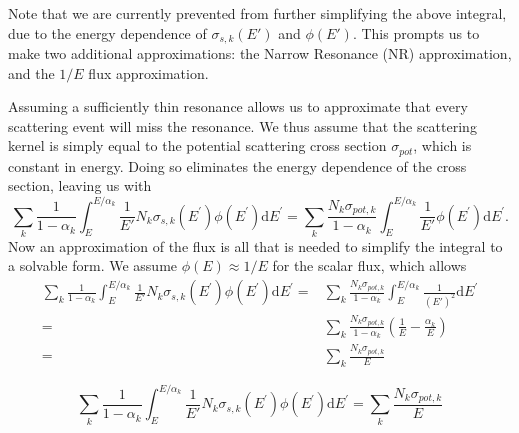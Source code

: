 \documentclass[10pt]{article}
\begin{document}
Note that we are currently prevented from further simplifying the above integral, due to the energy dependence of $\sigma_{s,k}(E')$ and $\phi(E')$. This prompts us to make two additional approximations: the Narrow Resonance (NR) approximation, and the $1/E$ flux approximation.\par

Assuming a sufficiently thin resonance allows us to approximate that every scattering event will miss the resonance. We thus assume that the scattering kernel is simply equal to the potential scattering cross section $\sigma_{pot}$, which is constant in energy. Doing so eliminates the energy dependence of the cross section, leaving us with
\begin{equation}\sum\limits_{k}\frac{1}{1-\alpha_{k}}\int_{E}^{E/\alpha_{k}}\frac{1}{E'}N_{k}\sigma_{s,k}\left(E^{\prime}\right)\phi\left(E^{\prime}\right)\mathrm{d}E^{\prime}=\sum\limits_{k}\frac{N_k\sigma_{pot,k}}{1-\alpha_{k}}\int_{E}^{E/\alpha_{k}}\frac{1}{E'}\phi\left(E^{\prime}\right)\mathrm{d}E^{\prime}.\end{equation}
  Now an approximation of the flux is all that is needed to simplify the integral to a solvable form. We assume $\phi(E)\approx1/E$ for the scalar flux, which allows 
\begin{align}\sum\limits_{k}\frac{1}{1-\alpha_{k}}\int_{E}^{E/\alpha_{k}}\frac{1}{E'}N_{k}\sigma_{s,k}\left(E^{\prime}\right)\phi\left(E^{\prime}\right)\mathrm{d}E^{\prime} 
  =&\sum\limits_{k}\frac{N_k\sigma_{pot,k}}{1-\alpha_{k}}\int_{E}^{E/\alpha_{k}}\frac{1}{(E')^2}\mathrm{d}E^{\prime}\\
  = &\sum\limits_{k}\frac{N_{k}\sigma_{pot,k}}{1-\alpha_{k}}\left(\frac{1}{E}-\frac{\alpha_k}{E}\right)\\
    =&\sum\limits_k\frac{N_{k}\sigma_{pot,k}}{E}
\end{align}


\begin{equation}\sum\limits_{k}\frac{1}{1-\alpha_{k}}\int_{E}^{E/\alpha_{k}}\frac{1}{E'}N_{k}\sigma_{s,k}\left(E^{\prime}\right)\phi\left(E^{\prime}\right)\mathrm{d}E^{\prime} =\sum\limits_k\frac{N_{k}\sigma_{pot,k}}{E}\label{eq:NRConclusion}\end{equation}
\end{document}
